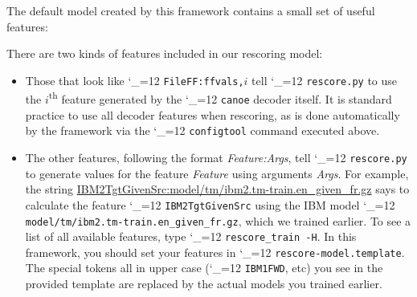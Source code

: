 \documentclass[11pt,letterpaper]{article}
\newcommand{\bs}{\textbackslash{}}
\def\code{\begingroup\catcode`\_=12 \codex}
\newcommand{\codex}[1]{\texttt{#1}\endgroup}
\begin{document}
The default model created by this framework contains a small set of useful
features:
There are two kinds of features included in our rescoring model:
\begin{itemize}
\item Those that look like \code{FileFF:ffvals,}$i$ tell \code{rescore.py} to
use the $i$\textsuperscript{th} feature generated by the \code{canoe} decoder
itself. It is standard practice to use all decoder features when rescoring, as
is done automatically by the framework via the \code{configtool} command
executed above.
\item The other features, following the format \emph{Feature:Args}, tell
\code{rescore.py} to generate values for the feature \emph{Feature} using
arguments \emph{Args}.  For example, the string
\url{IBM2TgtGivenSrc:model/tm/ibm2.tm-train.en_given_fr.gz} says to calculate
the feature \code{IBM2TgtGivenSrc} using the IBM model
\code{model/tm/ibm2.tm-train.en_given_fr.gz}, which we trained earlier. To
see a list of all available features, type \code{rescore_train -H}.  In this
framework, you should set your features in \code{rescore-model.template}.
The special tokens all in upper case (\code{IBM1FWD}, etc) you see in the
provided template are replaced by the actual models you trained earlier.
\end{itemize}
\end{document}
